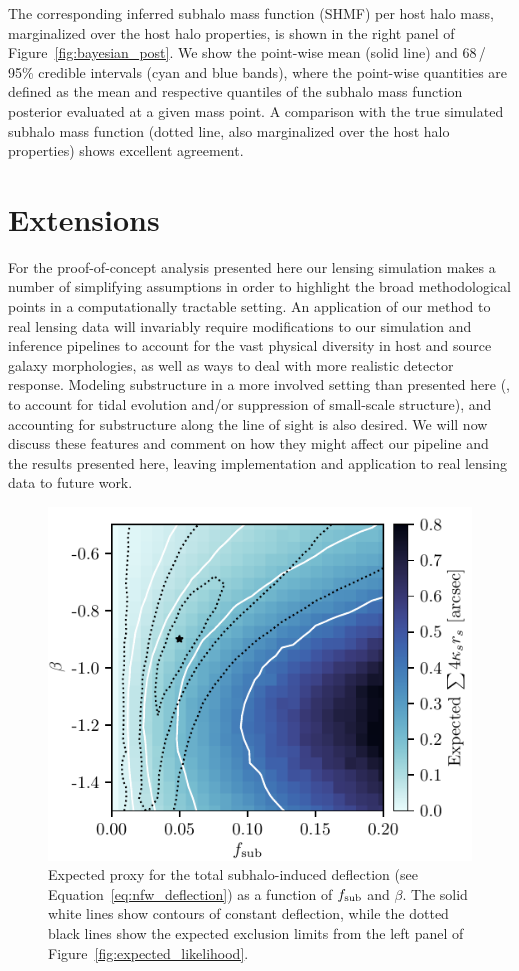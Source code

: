 \documentclass[twocolumn]{aastex63}
\begin{document}
The corresponding inferred subhalo mass function (SHMF) per host halo mass, marginalized over the host halo properties, is shown in the right panel of Figure~\ref{fig:bayesian_post}. We show the point-wise mean (solid line) and 68\,/\,95\% credible intervals (cyan and blue bands), where the point-wise quantities are defined as the mean and respective quantiles of the subhalo mass function posterior evaluated at a given mass point. A comparison with the true simulated subhalo mass function (dotted line, also marginalized over the host halo properties) shows excellent agreement.

\section{Extensions}
\label{sec:extensions}
%
For the proof-of-concept analysis presented here our lensing simulation makes a number of simplifying assumptions in order to highlight the broad methodological points in a computationally tractable setting. An application of our method to real lensing data will invariably require modifications to our simulation and inference pipelines to account for the vast physical diversity in host and source galaxy morphologies, as well as ways to deal with more realistic detector response. Modeling substructure in a more involved setting than presented here (\eg, to account for tidal evolution and/or suppression of small-scale structure), and accounting for substructure along the line of sight is also desired. We will now discuss these features and comment on how they might affect our pipeline and the results presented here, leaving implementation and application to real lensing data to future work.

\begin{figure}
\centering
\includegraphics[height=0.4\textwidth]{figures/warum_ist_die_banane_krumm}  %
\caption{Expected proxy for the total subhalo-induced deflection (see Equation~\eqref{eq:nfw_deflection}) as a function of $f_{\mathrm{sub}}$ and $\beta$. The solid white lines show contours of constant deflection, while the dotted black lines show the expected exclusion limits from the left panel of Figure~\ref{fig:expected_likelihood}. }
\label{fig:banana}
\end{figure}
\end{document}
